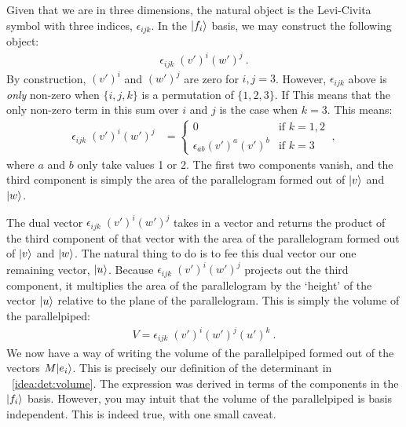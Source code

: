 Given that we are in three dimensions, the natural object is the Levi-Civita symbol with three indices, $\epsilon_{ijk}$. In the $\left|f_{i}\right\rangle$ basis, we may construct the following object:
\begin{align}
    \epsilon_{ijk}\;(v')^i(w')^j \ .
\end{align}
By construction, $(v')^i$ and $(w')^j$ are zero for $i,j=3$. However, $\epsilon_{ijk}$ above is \emph{only} non-zero when $\{i,j,k\}$ is a permutation of $\{1,2,3\}$. If This means that the only non-zero term in this sum over $i$ and $j$ is the case when $k=3$. This means:
\begin{align}
    \epsilon_{ijk}\;(v')^i(w')^j
    &=
    \begin{cases}
    0 &\text{if } k = 1,2\\
    \epsilon_{ab}(v')^a (v')^b &\text{if } k = 3
    \end{cases} \ ,
    \label{eq:det:eps:v:w}
\end{align}
where $a$ and $b$ only take values 1 or 2. The first two components vanish, and the third component is simply the area of the parallelogram formed out of $\left|v\right\rangle$ and $\left|w\right\rangle$. 

The dual vector $\epsilon_{ijk}\;(v')^i(w')^j$ takes in a vector and returns the product of the third component of that vector with the area of the parallelogram formed out of $\left|v\right\rangle$ and $\left|w\right\rangle$. The natural thing to do is to fee this dual vector our one remaining vector, $\left|u\right\rangle$. Because $\epsilon_{ijk}\;(v')^i(w')^j$ projects out the third component, it multiplies the area of the parallelogram by the `height' of the vector $\left|u\right\rangle$ relative to the plane of the parallelogram. This is simply the volume of the parallelpiped:
\begin{align}
    V = \epsilon_{ijk}\;(v')^i(w')^j(u')^k \ .
\end{align}
We now have a way of writing the volume of the parallelpiped formed out of the vectors $M{\left|e_i\right\rangle}$. This is precisely our definition of the determinant in \bigidearef{}~\ref{idea:det:volume}. The expression was derived in terms of the components in the $\left|f_i\right\rangle$ basis. However, you may intuit that the volume of the parallelpiped is basis independent. This is indeed true, with one small caveat.

